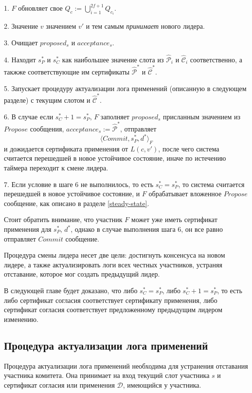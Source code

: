 1. $F$ обновляет свое $Q_c := \bigcup\limits_{i=1}^{2f+1} Q_{c_i}$.

2. Значение $v$ значением $v'$ и тем самым \textit{принимает} нового лидера.

3. Очищает $proposed_s$ и  $acceptance_s$.

4. Находит $s_P^{*}$ и $s_C^{*}$ как наибольшее значение слота из $\hat{\mathcal{P}}_i$ и $\hat{\mathcal{C}}_i$ соответственно, а такжже соответствующие им сертификаты $\hat{\mathcal{P}}^{*}$ и $\hat{\mathcal{C}}^{*}$.

5. Запускает процедуру актуализации лога применений (описанную в следующем разделе) с текущим слотом и $\hat{\mathcal{C}}^{*}$.

6. В случае если $s_C^{*}+1=s_P^{*}$, $F$ заполняет $proposed_s$ присланным значением из $Propose$ сообщения, $acceptance_s := \hat{\mathcal{P}}^{*}$, отправляет
\[ \langle Commit, s_P^{*}, d^{*} \rangle_F \]
и дожидается сертификата применения от $L(c, v')$, после чего система считается перешедшей в новое устойчивое состояние, иначе по истечению таймера переходит к смене лидера.

7. Если условие в шаге 6 не выполнилось, то есть $s_C^{*}=s_P^{*}$, то система считается перешедшей в новое устойчивое состояние, и $F$ обрабатывает вложенное $Propose$ сообщение, как описано в разделе \ref{steady-state}.

Стоит обратить внимание, что участник $F$ может уже иметь сертификат применения для $s_P^{*}$, $d^{*}$, однако в случае выполнения  шага 6, он все равно отправляет $Commit$ сообщение.

Процедура смены лидера несет две цели: достигнуть консенсуса на новом лидере, а также актуализировать логи всех честных участников, устраняя отставание, которое мог создать предыдущий лидер.

В следующей главе будет доказано, что либо $s_C^{*}=s_P^{*}$, либо $s_C^{*}+1=s_P^{*}$, то есть либо сертификат согласия соответствует сертификату применения, либо сертификат согласия соответствует предложенному предыдущим лидером изменению.

\subsection{Процедура актуализации лога применений} \label{act_log}
Процедура актуализации лога применений необходима для устранения отставания участника комитета.
Она принимает на вход текущий слот участника $s$ и сертификат согласия или применения $\mathcal{D}$, имеющийся у участника.


